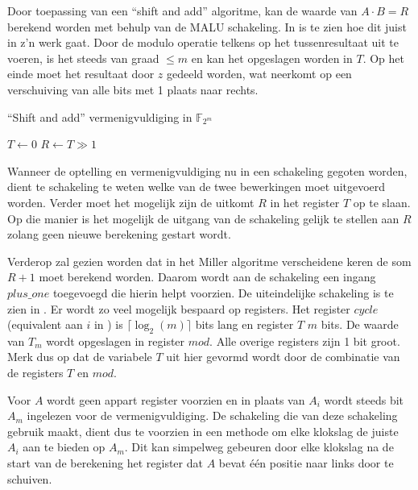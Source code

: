 Door toepassing van een ``shift and add'' algoritme, kan de waarde van \mbox{$A \cdot B = R$} berekend worden met behulp van de MALU schakeling. In  is te zien hoe dit juist in z'n werk gaat. Door de modulo operatie telkens op het tussenresultaat uit te voeren, is het steeds van graad $\leq m$ en kan het opgeslagen worden in $T$. Op het einde moet het resultaat door $z$ gedeeld worden, wat neerkomt op een verschuiving van alle bits met 1 plaats naar rechts.

\begin{algorithm}[h]
	\caption{``Shift and add'' vermenigvuldiging in $\mathbb{F}_{2^m}$}
	\label{algoritme-implementatie-gf2m-multiply}

	$T \leftarrow 0$\;
	$R \leftarrow T \gg 1$\;
\end{algorithm}

Wanneer de optelling en vermenigvuldiging nu in een schakeling gegoten worden, dient te schakeling te weten welke van de twee bewerkingen moet uitgevoerd worden. Verder moet het mogelijk zijn de uitkomt $R$ in het register $T$ op te slaan. Op die manier is het mogelijk de uitgang van de schakeling gelijk te stellen aan $R$ zolang geen nieuwe berekening gestart wordt.  

Verderop zal gezien worden dat in het Miller algoritme verscheidene keren de som $R + 1$ moet berekend worden. Daarom wordt aan de schakeling een ingang $plus\_one$ toegevoegd die hierin helpt voorzien. De uiteindelijke schakeling is te zien in . Er wordt zo veel mogelijk bespaard op registers. Het register $cycle$ (equivalent aan $i$ in ) is $\lceil \log _2 (m) \rceil$ bits lang en register $T$ $m$ bits. De waarde van $T_m$ wordt opgeslagen in register $mod$. Alle overige registers zijn 1 bit groot. Merk dus op dat de variabele $T$ uit  hier gevormd wordt door de combinatie van de registers $T$ en $mod$. 

Voor $A$ wordt geen appart register voorzien en in plaats van $A_i$ wordt steeds bit $A_m$ ingelezen voor de vermenigvuldiging. De schakeling die van deze schakeling gebruik maakt, dient dus te voorzien in een methode om elke klokslag de juiste $A_i$ aan te bieden op $A_m$. Dit kan simpelweg gebeuren door elke klokslag na de start van de berekening het register dat $A$ bevat \'e\'en positie naar links door te schuiven.

